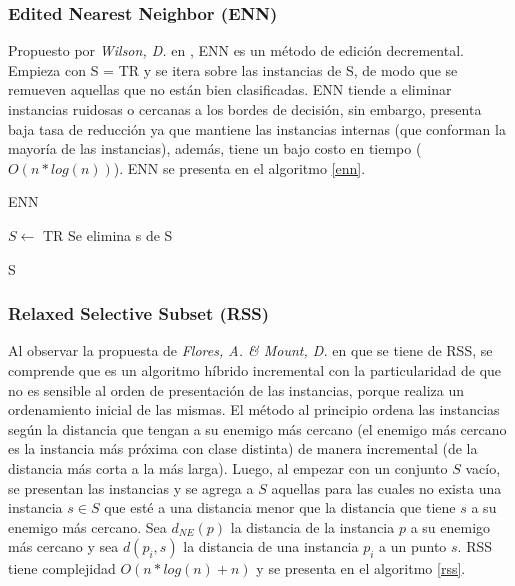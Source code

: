 \subsubsection{Edited Nearest Neighbor (ENN)}

Propuesto por  \emph{Wilson, D.} en \cite{wilson1972asymptotic}, ENN es un método de edición decremental. Empieza con S = TR y se itera sobre las instancias de S, de modo que se remueven aquellas que no están bien clasificadas. ENN tiende a eliminar instancias ruidosas o cercanas a los bordes de decisión, sin embargo, presenta baja tasa de reducción ya que mantiene las instancias internas (que conforman la mayoría de las instancias), además, tiene un bajo costo en tiempo ($O(n*log(n))$). ENN se presenta en el algoritmo \ref{enn}.

\begin{algorithm}
\caption{ENN}
\label{enn}
\begin{algorithmic}[1]


\State $S \gets$ TR
    \State Se elimina s de S
  \EndIf
\EndFor

\State \Return S

\end{algorithmic}
\end{algorithm}

\subsubsection{Relaxed Selective Subset (RSS)}

 Al observar la propuesta de \emph{Flores, A. \& Mount, D.} en \cite{floresnearest} que se tiene de RSS, se comprende que es un algoritmo híbrido incremental con la particularidad de que no es sensible al orden de presentación de las instancias, porque realiza un ordenamiento inicial de las mismas. El método al principio ordena las instancias según la distancia que tengan a su enemigo más cercano (el enemigo más cercano es la instancia más próxima con clase distinta) de manera incremental (de la distancia más corta a la más larga). Luego, al empezar con un conjunto $S$ vacío, se presentan las instancias y se agrega a $S$ aquellas para las cuales no exista una instancia $s \in S$ que esté a una distancia menor que la distancia que tiene $s$ a su enemigo más cercano. Sea $d_{NE}(p)$ la distancia de la instancia $p$ a su enemigo más cercano y sea $d(p_i,s)$ la distancia de una instancia $p_i$ a un punto $s$. RSS tiene complejidad $O(n*log(n)+n)$ y se presenta en el algoritmo \ref{rss}.

